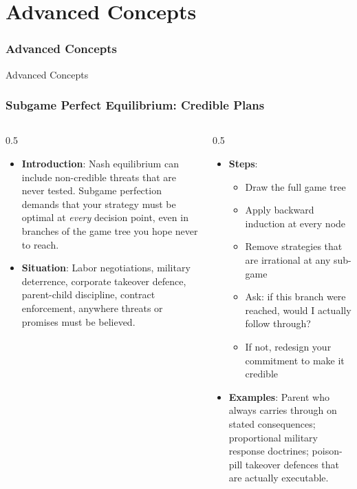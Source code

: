 \section{Advanced Concepts}

\begin{frame}[fragile]\frametitle{Advanced Concepts}
\begin{center}
{\Large Advanced Concepts}
\end{center}
\end{frame}


\begin{frame}[fragile]\frametitle{Subgame Perfect Equilibrium: Credible Plans}
\begin{columns}
    \begin{column}[T]{0.5\linewidth}
      \begin{itemize}
        \item \textbf{Introduction}: Nash equilibrium can include non-credible threats that are never tested. Subgame perfection demands that your strategy must be optimal at \textit{every} decision point, even in branches of the game tree you hope never to reach.
        \item \textbf{Situation}: Labor negotiations, military deterrence, corporate takeover defence, parent-child discipline, contract enforcement, anywhere threats or promises must be believed.
      \end{itemize}
    \end{column}
    \begin{column}[T]{0.5\linewidth}
      \begin{itemize}
        \item \textbf{Steps}:
        \begin{itemize}
          \item Draw the full game tree
          \item Apply backward induction at every node
          \item Remove strategies that are irrational at any sub-game
          \item Ask: if this branch were reached, would I actually follow through?
          \item If not, redesign your commitment to make it credible
        \end{itemize}\item \textbf{Examples}: Parent who always carries through on stated consequences; proportional military response doctrines; poison-pill takeover defences that are actually executable.

\end{itemize}
\end{column}
\end{columns}
\end{frame}
